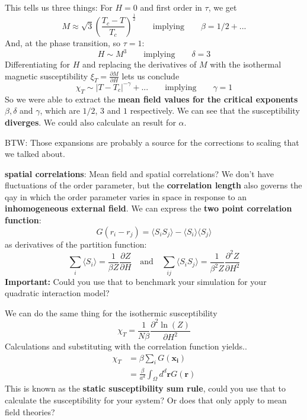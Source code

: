 	This tells us three things: For $H=0$ and first order in $\tau$, we get
	\begin{equation}
		M \approx \sqrt{3} \left(\frac{T_c - T}{T_c}\right)^{\frac{1}{2}} \qquad \text{implying} \qquad \beta = 1/2 + ...
	\end{equation}
	And, at the phase transition, so $\tau =	1$:
	\begin{equation}
		H \sim M^3 \qquad \text{implying} \qquad \delta = 3
	\end{equation}
	Differentiating for $H$ and replacing the derivatives of $M$ with the isothermal magnetic susceptibility $\xi_T =	\frac{\partial M}{\partial H}$ lets us conclude
	\begin{equation}
		\chi_T \sim |T - T_c|^{-\gamma} + ... \qquad \text{implying} \qquad \gamma =	1
	\end{equation}
	So we were able to extract the \textbf{mean field values for the critical exponents} $\beta , \delta$ and $\gamma$, which are $1/2$, 3 and $1$ respectively. We can see that the susceptibility \textbf{diverges}. We could also calculate an result for $\alpha$.
	
	BTW: Those expansions are probably a source for the corrections to scaling that we talked about.
	
	\textbf{spatial correlations}: Mean field and spatial correlations? We don't have fluctuations of the order parameter, but the \textbf{correlation length} also governs the qay in which the order parameter varies in space in response to an \textbf{inhomogeneous external field}. We can express the \textbf{two point correlation function}:
	\begin{equation}
		G(r_i - r_j) =	\langle S_i S_j \rangle - \langle S_i \rangle \langle S_j \rangle
	\end{equation}
	as derivatives of the partition function:
	\begin{equation}
		\sum_{i} \langle S_i \rangle =	\frac{1}{\beta Z} \frac{\partial Z}{\partial H} \quad \text{and} \quad  		\sum_{ij} \langle S_i S_j\rangle =	\frac{1}{\beta^2 Z} \frac{\partial^2 Z}{\partial H^2}
	\end{equation}
	\textbf{Important:} Could you use that to benchmark your simulation for your quadratic interaction model?
	
	We can do the same thing for the isothermic susceptibility
	\begin{equation}
		\chi_T =	\frac{1}{N \beta} \frac{\partial^2 \ln (Z)}{\partial H^2}
	\end{equation}
	Calculations and substituting with the correlation function yields..
	\begin{align}
		\chi_T 	&= \beta \sum_{i}G(\mathbf{x_i}) \\
		&= \frac{\beta}{a^d} \int_\Omega d^d\mathbf{r} G(\mathbf{r})
	\end{align}
	This is known as the \textbf{static susceptibility sum rule}, could you use that to calculate the susceptibility for your system? Or does that only apply to mean field theories?
	
